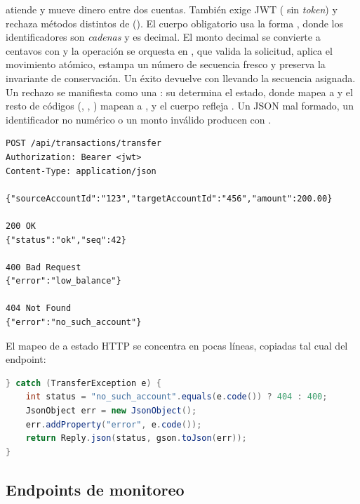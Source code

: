  atiende 
y mueve dinero entre dos cuentas. También exige JWT ( sin
\emph{token}) y rechaza métodos distintos de  (). El
cuerpo obligatorio usa la forma
,
donde los identificadores son \emph{cadenas} y  es decimal. El
monto decimal se convierte a centavos con  y la operación
se orquesta en , que valida la solicitud, aplica el
movimiento atómico, estampa un número de secuencia fresco y preserva la
invariante de conservación. Un éxito devuelve  con
 llevando la secuencia asignada. Un rechazo
se manifiesta como una : su  determina el
estado, donde  mapea a  y el resto de
códigos (, , )
mapean a , y el cuerpo refleja . Un JSON
mal formado, un identificador no numérico o un monto inválido producen
 con .

\begin{lstlisting}[language=none,caption={Contrato JSON de POST /api/transactions/transfer}]
POST /api/transactions/transfer
Authorization: Bearer <jwt>
Content-Type: application/json

{"sourceAccountId":"123","targetAccountId":"456","amount":200.00}

200 OK
{"status":"ok","seq":42}

400 Bad Request
{"error":"low_balance"}

404 Not Found
{"error":"no_such_account"}
\end{lstlisting}

El mapeo de  a estado HTTP se concentra en pocas
líneas, copiadas tal cual del endpoint:

\begin{lstlisting}[language=Java,caption={Mapeo de rechazos de transferencia a estado REST en TransferEndpoint.java}]
} catch (TransferException e) {
    int status = "no_such_account".equals(e.code()) ? 404 : 400;
    JsonObject err = new JsonObject();
    err.addProperty("error", e.code());
    return Reply.json(status, gson.toJson(err));
}
\end{lstlisting}

\subsection{Endpoints de monitoreo}

